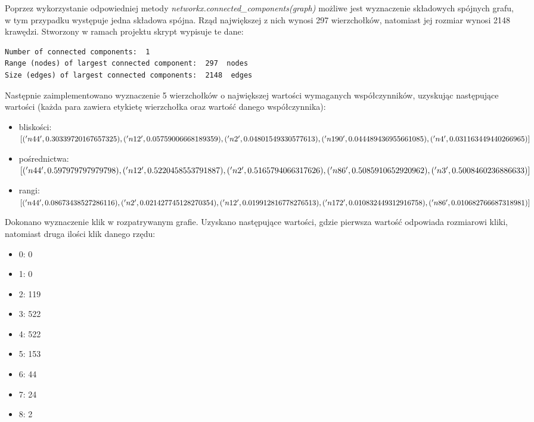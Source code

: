 \documentclass[10pt,a4paper]{article}
\begin{document}
Poprzez wykorzystanie odpowiedniej metody \textit{networkx.connected\_components(graph)} możliwe jest wyznaczenie składowych spójnych grafu, w tym przypadku występuje jedna składowa spójna. Rząd największej z nich wynosi 297 wierzchołków, natomiast jej rozmiar wynosi 2148 krawędzi. Stworzony w ramach projektu skrypt wypisuje te dane:

\begin{verbatim}
Number of connected components:  1
Range (nodes) of largest connected component:  297  nodes
Size (edges) of largest connected components:  2148  edges
\end{verbatim}

Następnie zaimplementowano wyznaczenie 5 wierzchołków o największej wartości wymaganych współczynników, uzyskując następujące wartości (każda para zawiera etykietę wierzchołka oraz wartość danego współczynnika):
\begin{itemize}
\item bliskości: \\
$[('n44', 0.30339720167657325), \\ ('n12', 0.05759006668189359), \\ ('n2', 0.04801549330577613),\\ ('n190', 0.044489436955661085),\\ ('n4', 0.031163449440266965)]$
\item pośrednictwa:\\
$[('n44', 0.597979797979798), \\('n12', 0.5220458553791887), \\('n2', 0.5165794066317626),\\ ('n86', 0.5085910652920962), \\('n3', 0.5008460236886633)]$

\item rangi:\\
$[('n44', 0.08673438527286116), \\('n2', 0.021427745128270354), \\('n12', 0.019912816778276513),\\ ('n172', 0.010832449312916758), \\('n86', 0.010682766687318981)]$
\end{itemize}

Dokonano wyznaczenie klik w rozpatrywanym grafie. Uzyskano następujące wartości, gdzie pierwsza wartość odpowiada rozmiarowi kliki, natomiast druga ilości klik danego rzędu:
\begin{itemize}
\item 0: 0
\item 1: 0
\item 2: 119
\item 3: 522
\item 4: 522
\item 5: 153
\item 6: 44
\item 7: 24
\item 8: 2
\end{itemize}
\end{document}
